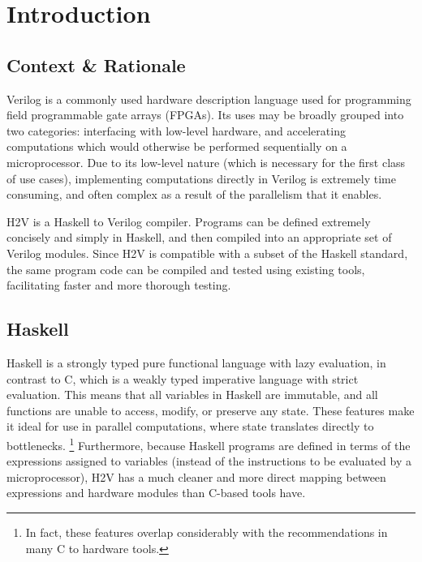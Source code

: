 \documentclass[english,onecolumn]{scrartcl}
\begin{document}
\newcommand\invisiblesection[1]{%
    \refstepcounter{section}%
    \addcontentsline{toc}{section}{\protect\numberline{\thesection}#1}%
    \sectionmark{#1}}

\begin{titlepage}

\end{titlepage}

\section{Introduction}
\subsection{Context \& Rationale}
Verilog is a commonly used hardware description language used for programming field programmable gate arrays (FPGAs).
Its uses may be broadly grouped into two categories: interfacing with low-level hardware, and accelerating computations which
would otherwise be performed sequentially on a microprocessor. Due to its low-level nature (which is necessary for the first class
of use cases), implementing computations directly in Verilog is extremely time consuming, and often complex as a result of the
parallelism that it enables.

H2V is a Haskell to Verilog compiler. Programs can be defined extremely concisely and simply in Haskell, and then compiled into an
appropriate set of Verilog modules. Since H2V is compatible with a subset of the Haskell standard, the same program code can be
compiled and tested using existing tools, facilitating faster and more thorough testing.

\subsection{Haskell}
Haskell is a strongly typed pure functional language with lazy evaluation, in contrast to C, which is a weakly typed imperative
language with strict evaluation. This means that all variables in Haskell are immutable, and all functions are unable to access,
modify, or preserve any state. These features make it ideal for use in parallel computations, where state translates directly to
bottlenecks.%
\footnote{In fact, these features overlap considerably with the recommendations in many C to hardware tools.\cite{C2H_UG}}
Furthermore, because Haskell programs are defined in terms of the expressions assigned to variables (instead of the instructions
to be evaluated by a microprocessor), H2V has a much cleaner and more direct mapping between expressions and hardware modules than
C-based tools have.
\end{document}

